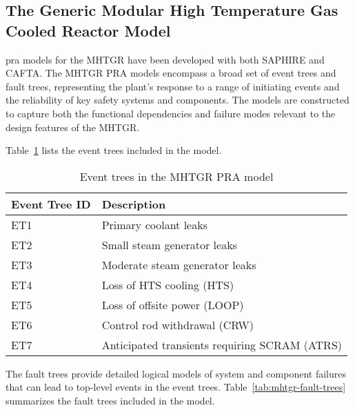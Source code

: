 \subsection{The Generic Modular High Temperature Gas Cooled Reactor Model}

\acrshort{pra} models for the MHTGR have been developed with both SAPHIRE and CAFTA. The MHTGR PRA models encompass a broad set of event trees and fault trees, representing the plant's response to a range of initiating events and the reliability of key safety systems and components. The models are constructed to capture both the functional dependencies and failure modes relevant to the design features of the MHTGR.

Table~\ref{tab:mhtgr-event-trees} lists the event trees included in the model.

\begin{table}[H]
    \centering
    \caption{Event trees in the MHTGR PRA model}
    \label{tab:mhtgr-event-trees}
    \begin{tabular}{ll}
        \toprule
        \textbf{Event Tree ID} & \textbf{Description} \\
        \midrule
        ET1 & Primary coolant leaks \\
        ET2 & Small steam generator leaks \\
        ET3 & Moderate steam generator leaks \\
        ET4 & Loss of HTS cooling (HTS) \\
        ET5 & Loss of offsite power (LOOP) \\
        ET6 & Control rod withdrawal (CRW) \\
        ET7 & Anticipated transients requiring SCRAM (ATRS) \\
        \bottomrule
    \end{tabular}
\end{table}

The fault trees provide detailed logical models of system and component failures that can lead to top-level events in the event trees. Table~\ref{tab:mhtgr-fault-trees} summarizes the fault trees included in the model.

